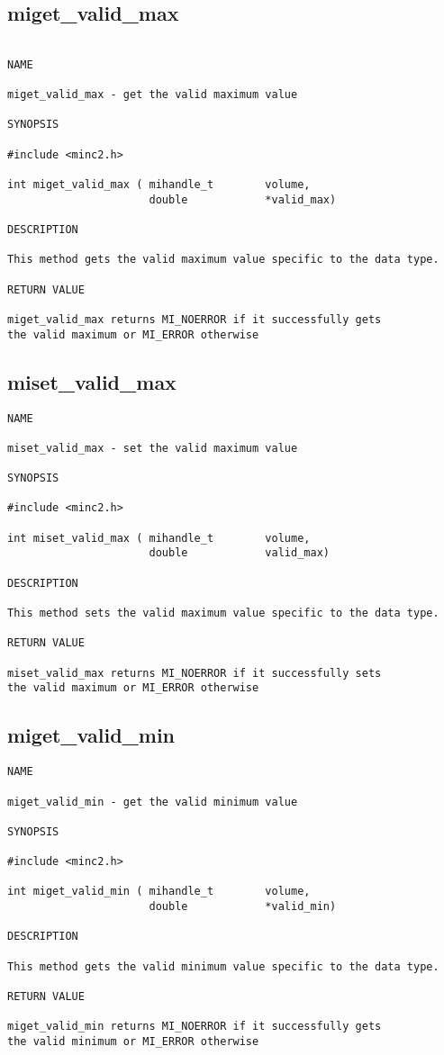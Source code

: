 \documentclass{article}
\begin{document}
\subsection{miget\_valid\_max}
\begin{verbatim}

NAME 

miget_valid_max - get the valid maximum value 

SYNOPSIS

#include <minc2.h>

int miget_valid_max ( mihandle_t        volume,
                      double            *valid_max)
                                
DESCRIPTION

This method gets the valid maximum value specific to the data type.

RETURN VALUE

miget_valid_max returns MI_NOERROR if it successfully gets 
the valid maximum or MI_ERROR otherwise
\end{verbatim}

\subsection{miset\_valid\_max}
\begin{verbatim}
NAME 

miset_valid_max - set the valid maximum value 

SYNOPSIS

#include <minc2.h>

int miset_valid_max ( mihandle_t        volume,
                      double            valid_max)
                                
DESCRIPTION

This method sets the valid maximum value specific to the data type.

RETURN VALUE

miset_valid_max returns MI_NOERROR if it successfully sets 
the valid maximum or MI_ERROR otherwise
\end{verbatim}

\subsection{miget\_valid\_min}
\begin{verbatim}
NAME 

miget_valid_min - get the valid minimum value 

SYNOPSIS

#include <minc2.h>

int miget_valid_min ( mihandle_t        volume,
                      double            *valid_min)
                                
DESCRIPTION

This method gets the valid minimum value specific to the data type.

RETURN VALUE

miget_valid_min returns MI_NOERROR if it successfully gets 
the valid minimum or MI_ERROR otherwise
\end{verbatim}
\end{document}
